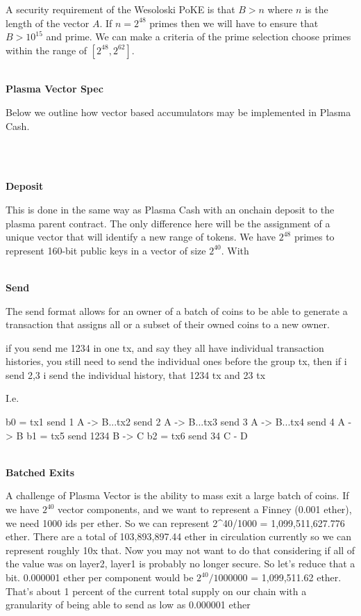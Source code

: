 \documentclass[11pt]{article}
\begin{document}
A security requirement of the Wesoloski PoKE is that $B > n$ where $n$ is the length of the vector $A$. If $n=2^{48}$ primes then we will have to ensure that $B > 10^{15}$ and prime. We can make a criteria of the prime selection choose primes within the range of $[2^{48}, 2^{62}]$.
\\
\\

\centerline{\textbf{Plasma Vector Spec}}

Below we outline how vector based accumulators may be implemented in Plasma Cash.

\\
\\
\centerline{\textbf{Deposit}}

This is done in the same way as Plasma Cash with an onchain deposit to the plasma parent contract. The only difference here will be the assignment of a unique vector that will identify a new range of tokens. We have $2^{48}$ primes to represent 160-bit public keys in a vector of size $2^{40}$. With 
\\
\\

\centerline{\textbf{Send}}

The send format allows for an owner of a batch of coins to be able to generate a transaction that assigns all or a subset of their owned coins to a new owner. 

if you send me 1234 in one tx, and say they all have individual transaction histories, you still need to send the individual ones before the group tx, then if i send 2,3 i send the individual history, that 1234 tx and 23 tx

I.e.

b0 = tx1 send 1 A -> B...tx2 send 2 A -> B...tx3 send 3 A -> B...tx4 send 4 A -> B
b1 = tx5 send 1234 B -> C
b2 = tx6 send 34 C - D
\\
\\

\centerline{\textbf{Batched Exits}}

A challenge of Plasma Vector is the ability to mass exit a large batch of coins. If we have $2^{40}$ vector components, and we want to represent a Finney (0.001 ether), we need 1000 ids per ether. So we can represent 2^40/1000 = 1,099,511,627.776 ether. There are a total of 103,893,897.44 ether in circulation currently so we can represent roughly  10x that. Now you may not want to do that considering if all of the value was on layer2, layer1 is probably no longer secure. So let's reduce that a bit. 0.000001 ether per component would be $2^{40}/1000000$ = 1,099,511.62 ether. That's about 1 percent of the current total supply on our chain with a granularity of being able to send as low as 0.000001 ether
\end{document}

